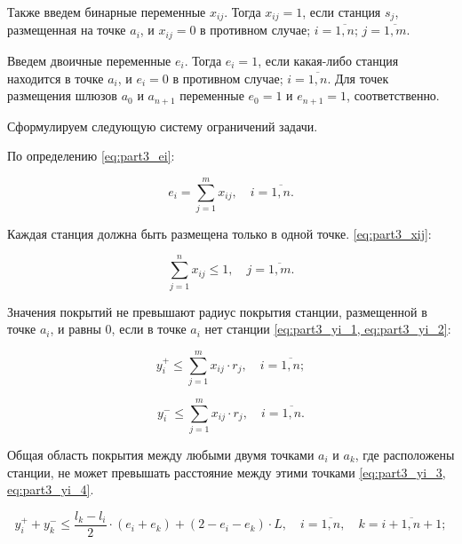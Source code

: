 Также введем бинарные переменные $x_{ij}$. Тогда $x_{ij}=1$, если станция $s_j$, размещенная на точке $a_i$, и $x_{ij}=0$ в противном случае; $i= \overline{1, n}$; $j = \overline{1,m}$.

Введем двоичные переменные $ e_i $. Тогда $ e_i = 1 $, если какая-либо станция находится в точке $ a_i $, и $ e_i = 0$  в противном случае; $ i = \overline {1, n} $. Для точек размещения шлюзов $ a_0 $ и $a_{n + 1}$ переменные $ e_0 = 1 $ и $ e_{n + 1} =1 $, соответственно. 


Сформулируем следующую систему ограничений задачи.

По определению \cref{eq:part3_ei}:

\begin{equation}
  \label{eq:part3_ei}
  e_i =  \sum\limits_{j=1}^m x_{ij}, \quad i = \overline{1,n}. 
\end{equation}

Каждая станция должна быть размещена только в одной точке. \cref{eq:part3_xij}:

\begin{equation}
  \label{eq:part3_xij}
  \sum\limits_{j=1}^n x_{ij} \leq 1, \quad j = \overline{1,m}. 
\end{equation}

Значения покрытий не превышают радиус покрытия станции, размещенной в точке $ a_i $, и равны 0, если в точке $a_i$  нет станции \cref{eq:part3_yi_1, eq:part3_yi_2}:


\begin{equation}
  \label{eq:part3_yi_1}
  y_i^+ \leq \sum\limits_{j=1}^m x_{ij} \cdot r_j, \quad i = \overline{1,n};
\end{equation}

\begin{equation}
  \label{eq:part3_yi_2}
  y_i^- \leq \sum\limits_{j=1}^m x_{ij} \cdot r_j, \quad i = \overline{1,n}. 
\end{equation}

Общая область покрытия между любыми двумя точками $ a_i $ и $ a_k $, где расположены станции, не может превышать расстояние между этими точками \cref{eq:part3_yi_3, eq:part3_yi_4}.

\begin{equation}
  \label{eq:part3_yi_3}
  y_i^+ + y_k^- \leq \frac{l_k - l_i}{2} \cdot (e_i + e_k ) + (2 - e_i - e_k ) \cdot L, \quad i = \overline{1,n},  \quad k = \overline{i+1,n+1};
\end{equation}

